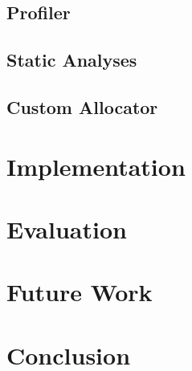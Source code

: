 \documentclass{article}
\begin{document}
\subsection{Profiler}

\subsection{Static Analyses}

\subsection{Custom Allocator}

\section{Implementation}

\section{Evaluation}

\section{Future Work}

\section{Conclusion}



\end{document}
